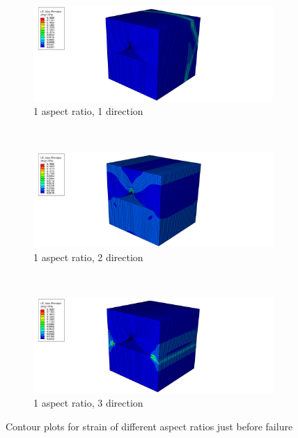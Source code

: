 \begin{figure}
    \begin{subfigure}[b]{0.80\textwidth}
    \includegraphics[width=\textwidth]{appendix_b/figures/1p1.png}
    \caption{1 aspect ratio, 1 direction}
  \end{subfigure}
  \\
    \begin{subfigure}[b]{0.80\textwidth}
    \includegraphics[width=\textwidth]{appendix_b/figures/1p2.png}
    \caption{1 aspect ratio, 2 direction}
  \end{subfigure}
  \\
  \begin{subfigure}[b]{0.80\textwidth}
    \includegraphics[width=\textwidth]{appendix_b/figures/1p3.png}
    \caption{1 aspect ratio, 3 direction}
  \end{subfigure}
  \caption{Contour plots for strain of different aspect ratios just before failure}
  \label{fig:Contourplot}
\end{figure}
\clearpage

